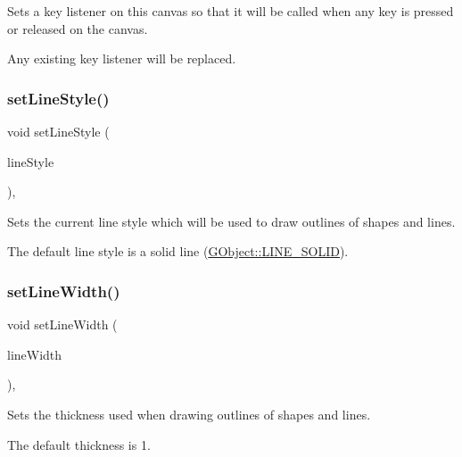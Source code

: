 Sets a key listener on this canvas so that it will be called when any key is pressed or released on the canvas. 

Any existing key listener will be replaced. \mbox{\label{classGDrawingSurface_a6bfe14a77101db0fb97b5a7e07a5526b}} 
\subsubsection{\texorpdfstring{set\+Line\+Style()}{setLineStyle()}}
{\footnotesize\ttfamily void set\+Line\+Style (\begin{DoxyParamCaption}\item[{\mbox{\hyperlink{classGObject_a86e0f5648542856159bb40775c854aa7}{G\+Object\+::\+Line\+Style}}}]{line\+Style }\end{DoxyParamCaption})\hspace{0.3cm}{\ttfamily [virtual]}, {\ttfamily [inherited]}}



Sets the current line style which will be used to draw outlines of shapes and lines. 

The default line style is a solid line (\mbox{\hyperlink{classGObject_a86e0f5648542856159bb40775c854aa7a700c78bc2cd76acaab26651bf7b4941f}{G\+Object\+::\+L\+I\+N\+E\+\_\+\+S\+O\+L\+ID}}). \mbox{\label{classGDrawingSurface_afd6a47c6ea6a1f85ca05a65ba3ff3477}} 
\subsubsection{\texorpdfstring{set\+Line\+Width()}{setLineWidth()}}
{\footnotesize\ttfamily void set\+Line\+Width (\begin{DoxyParamCaption}\item[{double}]{line\+Width }\end{DoxyParamCaption})\hspace{0.3cm}{\ttfamily [virtual]}, {\ttfamily [inherited]}}



Sets the thickness used when drawing outlines of shapes and lines. 

The default thickness is 1. \mbox{\label{classGInteractor_a04594e8ba9b98513a64f1da00dcae18c}} 
